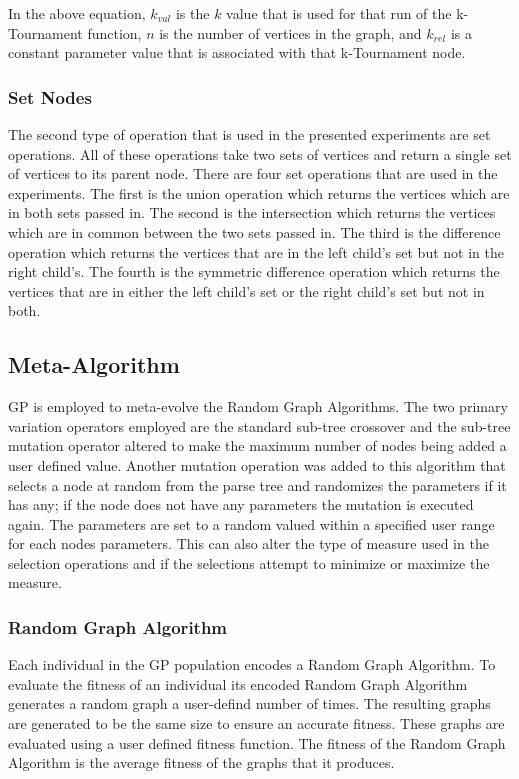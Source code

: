 \documentclass{article}
\begin{document}
In the above equation, $k_{val}$ is the $k$ value that is used for that run of the k-Tournament function, $n$ is the number of vertices in the graph, and $k_{rel}$
is a constant parameter value that is associated with that k-Tournament node.


\subsubsection{Set Nodes}

The second type of operation that is used in the presented experiments are set operations. All of these operations take two sets of vertices and return
a single set of vertices to its parent node. There are four set operations that are used in the experiments. The first is the union operation which returns
the vertices which are in both sets passed in. The second is the intersection which returns the vertices which are in common between the two sets passed in. 
The third is the difference operation which returns the vertices that are in the left child's set but not in the right child's. The fourth is the symmetric
difference operation which returns the vertices that are in either the left child's set or the right child's set but not in both. 


\subsection{Meta-Algorithm}
GP is employed to meta-evolve the Random Graph Algorithms. The two primary variation operators employed are the standard sub-tree crossover and the sub-tree
mutation operator altered to make the maximum number of nodes being added a user defined value. Another mutation operation was added to this algorithm that 
selects a node at random from the parse tree and randomizes the parameters if it has any; if the node does not have any parameters the mutation is executed again. 
The parameters are set to a random valued within a specified user range for each nodes parameters. This can also alter the type of measure used in the selection
operations and if the selections attempt to minimize or maximize the measure. 

\subsubsection{Random Graph Algorithm}
Each individual in the GP population encodes a Random Graph Algorithm. To evaluate the fitness of an individual its encoded Random Graph Algorithm generates
a random graph a user-defind number of times. The resulting graphs are generated to be the same size to ensure an accurate fitness. These graphs are evaluated 
using a user defined fitness function. The fitness of the Random Graph Algorithm is the average fitness of the graphs that it produces. 
\end{document}
